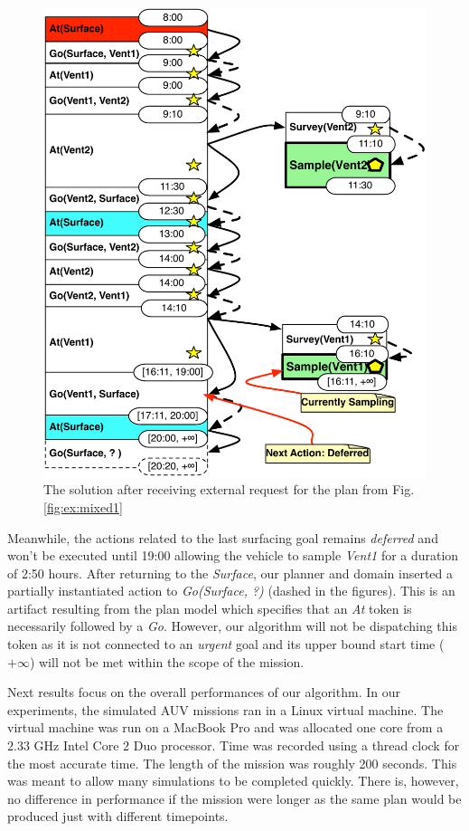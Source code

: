 \begin{figure}[t]
  \centering
  \includegraphics[width=0.8\columnwidth]{figs/example_MixedUpdate}
  \caption{\small The solution after receiving external request for
    the plan from Fig. \ref{fig:ex:mixed1}}
  \label{fig:ex:mixed2}
\end{figure}

Meanwhile, the actions related to the last surfacing goal remains {\em
  deferred} and won't be executed until 19:00 allowing the vehicle to
sample {\em Vent1} for a duration of 2:50 hours.  After returning to
the {\em Surface}, our planner and domain inserted a partially
instantiated action to {\em Go(Surface, ?)} (dashed in the figures).
This is an artifact resulting from the plan model which specifies that
an {\em At} token is necessarily followed by a {\em Go}.  However, our
algorithm will not be dispatching this token as it is not connected to
an {\em urgent} goal and its upper bound start time ($+\infty$) will
not be met within the scope of the mission.

Next results focus on the overall performances of our algorithm. In
our experiments, the simulated AUV missions ran in a Linux virtual
machine. The virtual machine was run on a MacBook Pro and was
allocated one core from a $2.33$ GHz Intel Core $2$ Duo processor.
Time was recorded using a thread clock for the most accurate time.
The length of the mission was roughly 200 seconds. This was meant to
allow many simulations to be completed quickly. There is, however, no
difference in performance if the mission were longer as the same plan
would be produced just with different timepoints.
 
